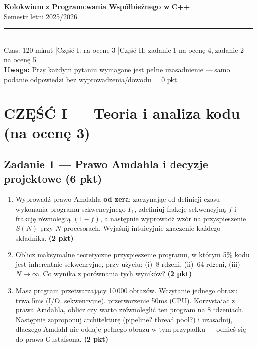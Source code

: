 \documentclass[11pt,a4paper]{article}
\newcommand{\pkt}[1]{\hfill\textbf{(#1 pkt)}}
\begin{document}
\begin{center}
	{\Large \textbf{Kolokwium z Programowania Współbieżnego w C++}}\\[3mm]
	{\large Semestr letni 2025/2026}\\[2mm]
	\rule{\textwidth}{0.4pt}\\[2mm]
	{\small Czas: 120 minut \quad|\quad Część I: na ocenę 3 \quad|\quad Część II: zadanie 1 na ocenę 4, zadanie 2 na ocenę 5}\\[1mm]
	{\small \textbf{Uwaga:} Przy każdym pytaniu wymagane jest \underline{pełne uzasadnienie} — samo podanie odpowiedzi bez wyprowadzenia/dowodu = 0 pkt.}
\end{center}

\vspace{5mm}

\section*{CZĘŚĆ I --- Teoria i analiza kodu (na ocenę 3)}

\subsection*{Zadanie 1 --- Prawo Amdahla i decyzje projektowe \pkt{6}}

\begin{enumerate}[label=(\alph*)]
\item Wyprowadź prawo Amdahla \textbf{od zera}: zaczynając od definicji czasu wykonania programu sekwencyjnego $T_1$, zdefiniuj frakcję sekwencyjną $f$ i frakcję równoległą $(1-f)$, a następnie wyprowadź wzór na przyspieszenie $S(N)$ przy $N$ procesorach. Wyjaśnij intuicyjnie znaczenie każdego składnika. \pkt{2}

\item Oblicz maksymalne teoretyczne przyspieszenie programu, w którym 5\% kodu jest inherentnie sekwencyjne, przy użyciu: (i)~8 rdzeni, (ii)~64 rdzeni, (iii)~$N \to \infty$. Co wynika z porównania tych wyników? \pkt{2}

\item Masz program przetwarzający 10\,000 obrazów. Wczytanie jednego obrazu trwa 5ms (I/O, sekwencyjne), przetworzenie 50ms (CPU). Korzystając z prawa Amdahla, oblicz czy warto zrównoleglić ten program na 8 rdzeniach. Następnie zaproponuj architekturę (pipeline? thread pool?) i uzasadnij, dlaczego Amdahl nie oddaje pełnego obrazu w tym przypadku --- odnieś się do prawa Gustafsona. \pkt{2}
\end{enumerate}
\end{document}
